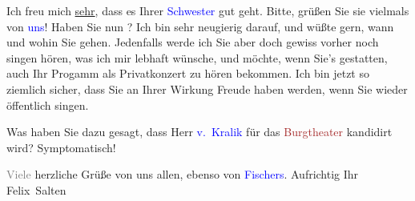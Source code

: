 \pstart
           Ich freu mich \uline{sehr}, dass es Ihrer \textcolor{blue}{Schwester}{}\ledrightnote{{$\rightarrow$}\textcolor{blue}{Elisabeth Steinrück}} gut geht. Bitte, grüßen Sie sie
               vielmals von \textcolor{blue}{uns}{}\ledrightnote{{$\rightarrow$}\textcolor{blue}{Ottilie Salten}}! Haben Sie
               nun \label{K_L03560-5v}\label{K_L03560-5h}? Ich bin sehr neugierig darauf, und wüßte gern,
               wann und wohin Sie gehen. Jedenfalls werde ich Sie aber doch gewiss vorher noch
               singen hören, was ich mir lebhaft wünsche, und möchte, wenn Sie’s gestatten, auch Ihr
               Progamm als Privatkonzert zu hören bekommen. Ich bin jetzt so ziemlich sicher, dass
               Sie an Ihrer Wirkung Freude haben werden, wenn Sie wieder öffentlich singen.\pend
           
\pstart
           Was haben Sie dazu gesagt, dass Herr \textcolor{blue}{v. Kralik}{}\ledrightnote{\textcolor{blue}{Richard Kralik}}
               für das \textcolor{brown}{Burgtheater}{}\ledrightnote{\textcolor{brown}{Burgtheater}} kandidirt wird?
               Symptomatisch!\pend
           
\pstart
           \textcolor{gray}{Viele} herzliche Grüße von uns allen, ebenso von \textcolor{blue}{Fischers}{}\ledrightnote{\textcolor{blue}{Samuel Fischer}{\newline}\textcolor{blue}{Hedwig Fischer}}.\pend
           \pstart Aufrichtig Ihr \spacefill\mbox{Felix Salten}\pend{}\endnumbering{}  
      